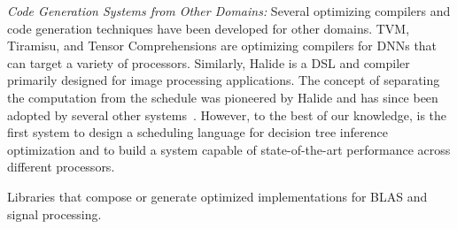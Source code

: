 \emph{Code Generation Systems from Other Domains:}
Several optimizing compilers and code generation techniques have been developed 
for other domains. TVM\cite{TVM}, Tiramisu\cite{Tiramisu}, and Tensor 
Comprehensions\cite{TensorComprehensions} are optimizing compilers 
for DNNs that can target a variety of processors. Similarly, 
Halide\cite{Halide} is a DSL and compiler primarily designed for 
image processing applications. The concept of separating the computation 
from the schedule was pioneered by Halide and has since been adopted 
by several other systems~\cite{TVM,Tiramisu,GraphIt}. However, to 
the best of our knowledge, \Treebeard{} is the first system to design
a scheduling language for decision tree inference optimization
and to build a system capable of state-of-the-art performance 
across different processors.

Libraries that compose or generate optimized implementations  
for BLAS\cite{BLIS, atlas_sc98, CUTLASS} and signal processing\cite{FFTW, SPIRAL}.

